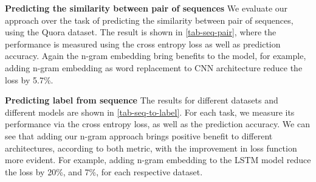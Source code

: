 \noindent \textbf{Predicting the similarity between pair of sequences}
We evaluate our approach over the task of predicting the similarity between pair of sequences, using the Quora dataset. The result is shown in \autoref{tab-seq-pair}, where the performance is measured using the cross entropy loss as well as prediction accuracy. Again the n-gram embedding bring benefits to the model, for example, adding n-gram embedding as word replacement to CNN architecture reduce the loss by 5.7\%.

\noindent \textbf{Predicting label from sequence}
The results for different datasets and different models are shown in \autoref{tab-seq-to-label}. For each task, we measure its performance via the cross entropy loss, as well as the prediction accuracy. We can see that adding our n-gram approach brings positive benefit to different architectures, according to both metric, with the improvement in loss function more evident. For example, adding n-gram embedding to the LSTM model reduce the loss by 20\%, and 7\%, for each respective dataset.


